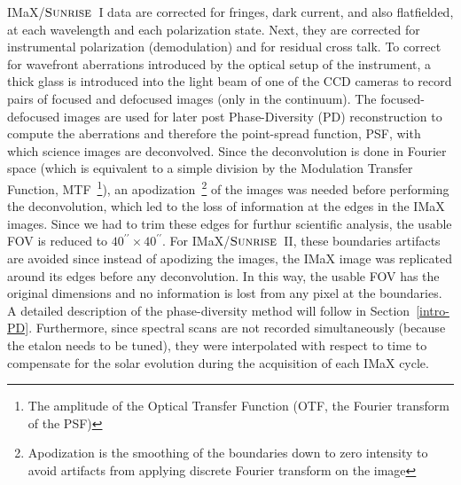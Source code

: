\documentclass[goettingen, gauss, print]{thesis}
\begin{document}
IMaX/$\textsc{Sunrise}$~I data are corrected for fringes, dark current, and also flatfielded, at each wavelength and each polarization state. Next, they are corrected for instrumental polarization (demodulation) and for residual cross talk. To correct for wavefront aberrations introduced by the optical setup of the instrument, a thick glass is introduced into the light beam of one of the CCD cameras to record pairs of focused and defocused images (only in the continuum). The focused-defocused images are used for later post Phase-Diversity (PD) reconstruction to compute the aberrations and therefore the point-spread function, PSF, with which science images are deconvolved. 
Since the deconvolution is done in Fourier space (which is equivalent to a simple division by the Modulation Transfer Function, MTF~\footnote{The amplitude of the Optical Transfer Function (OTF, the Fourier transform of the PSF)}), an apodization~\footnote{Apodization is the smoothing of the boundaries down to zero intensity to avoid artifacts from applying discrete Fourier transform on the image} of the images was needed before performing the deconvolution, which led to the loss of information at the edges in the IMaX images. Since we had to trim these edges for furthur scientific analysis, the usable FOV is reduced to $40^{\prime\prime}\times40^{\prime\prime}$. For IMaX/$\textsc{Sunrise}$~II, these boundaries artifacts are avoided since instead of apodizing the images, the IMaX image was replicated around its edges before any deconvolution. In this way, the usable FOV has the original dimensions and no information is lost from any pixel at the boundaries. A detailed description of the phase-diversity method will follow in Section~\ref{intro-PD}. 
Furthermore, since spectral scans are not recorded simultaneously (because the etalon needs to be tuned), they were interpolated with respect to time to compensate for the solar evolution during the acquisition of each IMaX cycle. 
\end{document}
